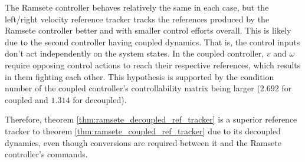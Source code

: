 The Ramsete \gls{controller} behaves relatively the same in each case, but the
left/right velocity \gls{reference} tracker tracks the \glspl{reference}
produced by the Ramsete \gls{controller} better and with smaller
\glspl{control effort} overall. This is likely due to the second
\gls{controller} having coupled dynamics. That is, the control inputs don't act
independently on the system \glspl{state}. In the coupled \gls{controller}, $v$
and $\omega$ require opposing control actions to reach their respective
\glspl{reference}, which results in them fighting each other. This hypothesis is
supported by the condition number of the coupled \gls{controller}'s
controllability matrix being larger ($2.692$ for coupled and $1.314$ for
decoupled).

Therefore, theorem \ref{thm:ramsete_decoupled_ref_tracker} is a superior
\gls{reference} tracker to theorem \ref{thm:ramsete_coupled_ref_tracker} due to
its decoupled dynamics, even though conversions are required between it and the
Ramsete \gls{controller}'s commands.
